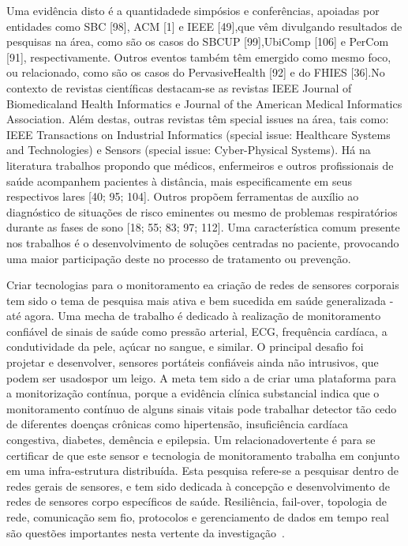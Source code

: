 Uma evidência disto é a quantidadede simpósios e conferências, apoiadas por entidades como SBC [98], ACM [1] e IEEE [49],que vêm divulgando resultados de pesquisas na área, como são os casos do SBCUP [99],UbiComp [106] e PerCom [91], respectivamente. Outros eventos também têm emergido como mesmo foco, ou relacionado, como são os casos do PervasiveHealth [92] e do FHIES [36].No contexto de revistas científicas destacam-se as revistas IEEE Journal of Biomedicaland Health Informatics e Journal of the American Medical Informatics Association. Além destas, outras revistas têm special issues na área, tais como: IEEE Transactions on Industrial
Informatics (special issue: Healthcare Systems and Technologies) e Sensors (special issue: Cyber-Physical Systems). Há na literatura trabalhos propondo que médicos, enfermeiros e outros profissionais de saúde acompanhem pacientes à distância, mais especificamente em seus respectivos lares [40; 95; 104]. Outros propõem ferramentas de auxílio ao diagnóstico de situações de risco eminentes ou mesmo de problemas respiratórios durante as fases de sono [18; 55; 83; 97; 112]. Uma característica comum presente nos trabalhos é o desenvolvimento de soluções centradas no paciente, provocando uma maior participação deste no processo de tratamento
ou prevenção.


Criar tecnologias para o monitoramento ea criação de redes de sensores corporais tem sido o tema de pesquisa mais ativa e bem sucedida em saúde generalizada - até agora. Uma mecha de trabalho é dedicado à realização de monitoramento confiável de sinais de saúde como pressão arterial, ECG, frequência cardíaca, a condutividade da pele, açúcar no sangue, e similar. O principal desafio foi projetar e desenvolver, sensores portáteis confiáveis ​​ainda não intrusivos, que podem ser usados ​​por um leigo. A meta tem sido a de criar uma plataforma para a monitorização contínua, porque a evidência clínica substancial indica que o monitoramento contínuo de alguns sinais vitais pode trabalhar detector tão cedo de diferentes doenças crônicas como hipertensão, insuficiência cardíaca congestiva, diabetes, demência e epilepsia. Um relacionadovertente é para se certificar de que este sensor e tecnologia de monitoramento trabalha em conjunto em uma infra-estrutura distribuída. Esta pesquisa refere-se a pesquisar dentro de redes gerais de sensores, e tem sido dedicada à concepção e desenvolvimento de redes de sensores corpo específicos de saúde. Resiliência, fail-over, topologia de rede, comunicação sem fio, protocolos e gerenciamento de dados em tempo real são questões importantes nesta vertente da investigação~\cite{bardram2008}.

